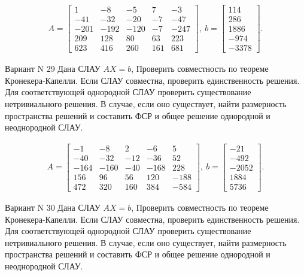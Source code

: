 \documentclass[11pt]{report}
\begin{document}
\begin{align*}
 A = \left[\begin{matrix}1 & -8 & -5 & 7 & -3\\-41 & -32 & -20 & -7 & -47\\-201 & -192 & -120 & -7 & -247\\209 & 128 & 80 & 63 & 223\\623 & 416 & 260 & 161 & 681\end{matrix}\right],
\ b = \left[\begin{matrix}114\\286\\1886\\-974\\-3378\end{matrix}\right]. 
 \end{align*}

Вариант N 29
Дана СЛАУ $AX = b$,
Проверить совместность по теореме Кронекера-Капелли. Если СЛАУ совместна, проверить единственность решения.
Для соответствующей однородной СЛАУ проверить существование нетривиального решения. В случае, если оно существует,
найти размерность пространства решений и составить ФСР и общее решение однородной  и неоднородной СЛАУ.


\begin{align*}
 A = \left[\begin{matrix}-1 & -8 & 2 & -6 & 5\\-40 & -32 & -12 & -36 & 52\\-164 & -160 & -40 & -168 & 228\\156 & 96 & 56 & 120 & -188\\472 & 320 & 160 & 384 & -584\end{matrix}\right],
\ b = \left[\begin{matrix}-21\\-492\\-2052\\1884\\5736\end{matrix}\right]. 
 \end{align*}

Вариант N 30
Дана СЛАУ $AX = b$,
Проверить совместность по теореме Кронекера-Капелли. Если СЛАУ совместна, проверить единственность решения.
Для соответствующей однородной СЛАУ проверить существование нетривиального решения. В случае, если оно существует,
найти размерность пространства решений и составить ФСР и общее решение однородной  и неоднородной СЛАУ.
\end{document}
